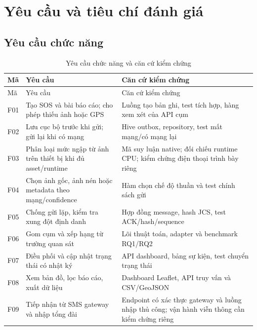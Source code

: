\section{Yêu cầu và tiêu chí đánh giá}\label{sec:01-foundations-requirements}
\subsection{Yêu cầu chức năng}
\begin{longtable}{P{.10\textwidth}P{.40\textwidth}P{.39\textwidth}}
\caption{Yêu cầu chức năng và căn cứ kiểm chứng}\label{tab:functional-requirements}\\
\toprule Mã & Yêu cầu & Căn cứ kiểm chứng \\\midrule\endfirsthead
\toprule Mã & Yêu cầu & Căn cứ kiểm chứng \\\midrule\endhead
F01 & Tạo SOS và bài báo cáo; cho phép thiếu ảnh hoặc GPS & Luồng tạo bản ghi, test tích hợp, hàng xem xét của API cụm \\
F02 & Lưu cục bộ trước khi gửi; gửi lại khi có mạng & Hive outbox, repository, test mất mạng/có mạng lại \\
F03 & Phân loại mức ngập từ ảnh trên thiết bị khi đủ asset/runtime & Mã suy luận native; đối chiếu runtime CPU; kiểm chứng điện thoại trình bày riêng \\
F04 & Chọn ảnh gốc, ảnh nén hoặc metadata theo mạng/confidence & Hàm chọn chế độ thuần và test chính sách gửi \\
F05 & Chống gửi lặp, kiểm tra xung đột định danh & Hợp đồng message, hash JCS, test ACK/hash/sequence \\
F06 & Gom cụm và xếp hạng từ trường quan sát & Lõi thuật toán, adapter và benchmark RQ1/RQ2 \\
F07 & Điều phối và cập nhật trạng thái có nhật ký & API dashboard, bảng sự kiện, test chuyển trạng thái \\
F08 & Xem bản đồ, lọc báo cáo, xuất dữ liệu & Dashboard Leaflet, API truy vấn và CSV/GeoJSON \\
F09 & Tiếp nhận từ SMS gateway và nhập tổng đài & Endpoint có xác thực gateway và luồng nhập thủ công; vận hành viễn thông cần kiểm chứng riêng \\
\bottomrule
\end{longtable}

